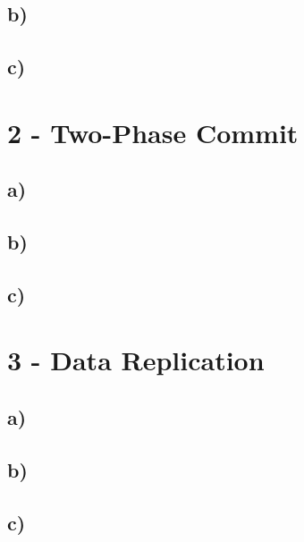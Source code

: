 \documentclass{scrartcl}
\begin{document}
\subsection*{b)}
\subsection*{c)}

\section*{2 - Two-Phase Commit}
\subsection*{a)}
\subsection*{b)}
\subsection*{c)}

\section*{3 - Data Replication}
\subsection*{a)}
\subsection*{b)}
\subsection*{c)}
\end{document}
